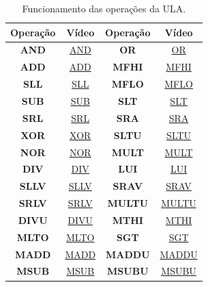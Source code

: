 \documentclass[12pt]{article}
\begin{document}
\begin{table}[H]
	\centering
	\begin{tabular}{|c|c|c|c|}
		\hline
		\textbf{Operação} & \textbf{Vídeo} & \textbf{Operação} & \textbf{Vídeo} \\
		\hline
		\textbf{AND} & \href{https://youtu.be/3rOvkaxYP6Q}{AND}  & \textbf{OR} & \href{https://youtu.be/sCqV4z5Az1Q}{OR} \\\hline
		\textbf{ADD} &  \href{https://youtu.be/PtU2MOLjm94}{ADD} & \textbf{MFHI} &  \href{https://youtu.be/iNjcvIy_Pdk}{MFHI} \\\hline
		\textbf{SLL} &  \href{https://youtu.be/oegfAdN_HYc}{SLL}  & \textbf{MFLO} &  \href{https://youtu.be/yJljNxGftc4}{MFLO}  \\\hline
		\textbf{SUB} &  \href{https://youtu.be/jSYAjTycOTo}{SUB}  & \textbf{SLT} &  \href{https://youtu.be/I3R0-LyBugU}{SLT}  \\\hline
		\textbf{SRL} &  \href{https://youtu.be/wdsBH2myWbc}{SRL} & \textbf{SRA} &  \href{https://youtu.be/aSTUbG23kdI}{SRA}   \\\hline
		\textbf{XOR}  &  \href{https://youtu.be/svrkxXt0xOo}{XOR}  & \textbf{SLTU} &  \href{https://youtu.be/IazxX0OtrLE}{SLTU} \\\hline
		\textbf{NOR} &  \href{https://youtu.be/ryqZ4veRVwU}{NOR} & \textbf{MULT} &  \href{https://youtu.be/TvRZG23bw78}{MULT} \\\hline
		\textbf{DIV} &  \href{https://youtu.be/l3nE2rxqUuY}{DIV}  & \textbf{LUI} &  \href{https://youtu.be/lTs8LDFBiIE}{LUI} \\\hline
		\textbf{SLLV} &  \href{https://youtu.be/e2SjS3GcqtE}{SLLV}  & \textbf{SRAV} &  \href{https://youtu.be/KtDoa7oxJoA}{SRAV} \\\hline
		\textbf{SRLV} &  \href{https://youtu.be/OUE1ZjfH8Ik}{SRLV}  & \textbf{MULTU} &  \href{https://youtu.be/h-uhXsqb4P8}{MULTU} \\\hline
		\textbf{DIVU} &  \href{https://youtu.be/WT5tO2XGpzQ}{DIVU}  & \textbf{MTHI}  &  \href{https://youtu.be/IYm4v_aq9-Y}{MTHI} \\\hline
		\textbf{MLTO} &  \href{https://youtu.be/tr9hoLc1JdA}{MLTO}  & \textbf{SGT} &  \href{https://youtu.be/zZKrvQjfPXE}{SGT} \\\hline
		\textbf{MADD} &  \href{https://youtu.be/Hz9OGA9WENg}{MADD}  & \textbf{MADDU} &  \href{https://youtu.be/Hz9OGA9WENg}{MADDU} \\\hline
		\textbf{MSUB} &  \href{https://youtu.be/graIEulipuM}{MSUB}  & \textbf{MSUBU}  &  \href{https://youtu.be/graIEulipuM}{MSUBU} \\\hline
	\end{tabular}
	\caption{Funcionamento das operações da ULA.}
	\label{tab:youtubeULA}
\end{table}
\end{document}
